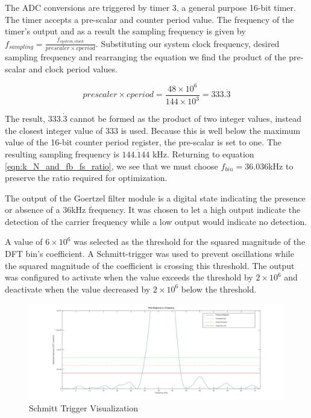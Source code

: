 The ADC conversions are triggered by timer 3, a general purpose 16-bit timer. The timer accepts a pre-scalar and counter period value. The frequency of the timer's output and as a result the sampling frequency is given by \(f_{sampling} = \frac{f_{system\_clock}}{prescaler \times cperiod}\). Substituting our system clock frequency, desired sampling frequency and rearranging the equation we find the product of the pre-scalar and clock period values.

\[prescaler \times cperiod = \frac{48 \times 10^6}{144 \times 10^3} = 333.\dot{3}\]

The result, $333.\dot{3}$ cannot be formed as the product of two integer values, instead the closest integer value of 333 is used. Because this is well below the maximum value of the 16-bit counter period register, the pre-scalar is set to one. The resulting sampling frequency is $144.\dot{1}4\dot{4}$ kHz. Returning to equation \ref{eqn:k_N_and_fb_fs_ratio}, we see that we must choose $f_{bin} = 36.036$kHz to preserve the ratio required for optimization.

The output of the Goertzel filter module is a digital state indicating the presence or absence of a 36kHz frequency. It was chosen to let a high output indicate the detection of the carrier frequency while a low output would indicate no detection.

A value of $6\times 10^{6}$ was selected as the threshold for the squared magnitude of the DFT bin's coefficient. A Schmitt-trigger was used to prevent oscillations while the squared magnitude of the coefficient is crossing this threshold. The output was configured to activate when the value exceeds the threshold by $2\times 10^{6}$ and deactivate when the value decreased by $2\times 10^{6}$ below the threshold.

\begin{figure}[H]
	\centering
	\includegraphics[width=.8\textwidth]{figures/design/schmit_simulation_wide.png}
	\caption{Schmitt Trigger Visualization}
	\label{fig:schmit_simulation_wide}
\end{figure}

